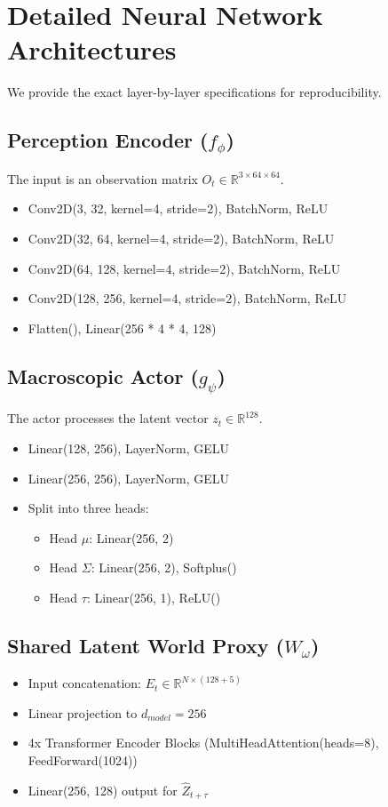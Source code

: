 \documentclass[conference]{IEEEtran}
\begin{document}
\section{Detailed Neural Network Architectures}
We provide the exact layer-by-layer specifications for reproducibility.
\subsection{Perception Encoder ($f_\phi$)}
The input is an observation matrix $O_t \in \mathbb{R}^{3 \times 64 \times 64}$.
\begin{itemize}
    \item Conv2D(3, 32, kernel=4, stride=2), BatchNorm, ReLU
    \item Conv2D(32, 64, kernel=4, stride=2), BatchNorm, ReLU
    \item Conv2D(64, 128, kernel=4, stride=2), BatchNorm, ReLU
    \item Conv2D(128, 256, kernel=4, stride=2), BatchNorm, ReLU
    \item Flatten(), Linear(256 * 4 * 4, 128)
\end{itemize}
\subsection{Macroscopic Actor ($g_\psi$)}
The actor processes the latent vector $z_t \in \mathbb{R}^{128}$.
\begin{itemize}
    \item Linear(128, 256), LayerNorm, GELU
    \item Linear(256, 256), LayerNorm, GELU
    \item Split into three heads:
    \begin{itemize}
        \item Head $\mu$: Linear(256, 2)
        \item Head $\Sigma$: Linear(256, 2), Softplus()
        \item Head $\tau$: Linear(256, 1), ReLU()
    \end{itemize}
\end{itemize}
\subsection{Shared Latent World Proxy ($W_\omega$)}
\begin{itemize}
    \item Input concatenation: $E_t \in \mathbb{R}^{N \times (128 + 5)}$
    \item Linear projection to $d_{model} = 256$
    \item 4x Transformer Encoder Blocks (MultiHeadAttention(heads=8), FeedForward(1024))
    \item Linear(256, 128) output for $\hat{Z}_{t+\tau}$
\end{itemize}
\end{document}
